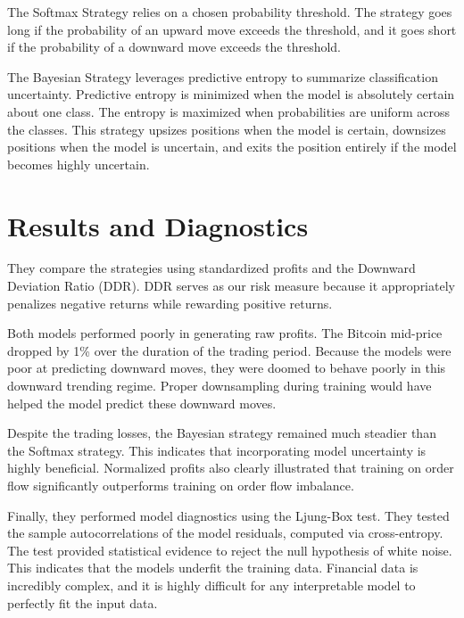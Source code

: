 The Softmax Strategy relies on a chosen probability threshold. The strategy goes long if the probability of an upward move exceeds the threshold, and it goes short if the probability of a downward move exceeds the threshold. 

The Bayesian Strategy leverages predictive entropy to summarize classification uncertainty. Predictive entropy is minimized when the model is absolutely certain about one class. The entropy is maximized when probabilities are uniform across the classes. This strategy upsizes positions when the model is certain, downsizes positions when the model is uncertain, and exits the position entirely if the model becomes highly uncertain.

\section{Results and Diagnostics}

They compare the strategies using standardized profits and the Downward Deviation Ratio (DDR). DDR serves as our risk measure because it appropriately penalizes negative returns while rewarding positive returns.

Both models performed poorly in generating raw profits. The Bitcoin mid-price dropped by 1\% over the duration of the trading period. Because the models were poor at predicting downward moves, they were doomed to behave poorly in this downward trending regime. Proper downsampling during training would have helped the model predict these downward moves.

Despite the trading losses, the Bayesian strategy remained much steadier than the Softmax strategy. This indicates that incorporating model uncertainty is highly beneficial. Normalized profits also clearly illustrated that training on order flow significantly outperforms training on order flow imbalance.

Finally, they performed model diagnostics using the Ljung-Box test. They tested the sample autocorrelations of the model residuals, computed via cross-entropy. The test provided statistical evidence to reject the null hypothesis of white noise. This indicates that the models underfit the training data. Financial data is incredibly complex, and it is highly difficult for any interpretable model to perfectly fit the input data.